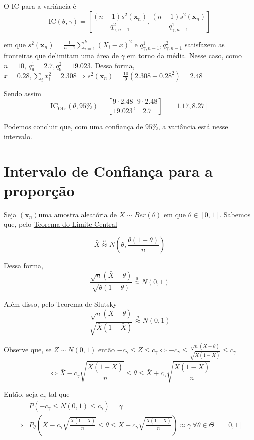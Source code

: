 \documentclass[
  letterpaper,
  DIV=11,
  numbers=noendperiod]{scrreprt}
\begin{document}
O IC para a variância é \[
\mathrm{IC}(\theta, \gamma) = \left[\frac{(n-1)s^2 (\pmb{x}_{n})}{q^2_{\gamma,n-1}},\frac{(n-1)s^2 (\pmb{x}_{n})}{q^1_{\gamma,n-1}}\right]
\]

em que
\(s^2 (\pmb{x}_{n}) = \frac{1}{n-1}\sum^{k}_{i=1}(X_i - \bar{x})^2\) e
\(q^{1}_{\gamma, n-1}, q^{2}_{\gamma, n-1}\) satisfazem as fronteiras
que delimitam uma área de \(\gamma\) em torno da média. Nesse caso, como
\(n = 10\), \(q^{1}_{9} = 2.7, q^{2}_{9} = 19.023\). Dessa forma,
\(\bar{x} = 0.28, \sum_{i}x_{i}^2=2.308 \Rightarrow s^2(\pmb{x}_{n}) = \frac{10}{9}(2.308 - 0.28^2) = 2.48\)

Sendo assim \[
\mathrm{IC}_{\mathrm{Obs}}(\theta, 95\%) = \left[\frac{9 \cdot 2.48}{19.023}, \frac{9 \cdot 2.48}{2.7}\right] = [1.17, 8.27]
\]

Podemos concluir que, com uma confiança de \(95\%\), a variância está
nesse intervalo.

\section{Intervalo de Confiança para a
proporção}\label{intervalo-de-confianuxe7a-para-a-proporuxe7uxe3o}

Seja \((\pmb{x}_{n})\)uma amostra aleatória de \(X\sim Ber(\theta)\) em
que \(\theta \in [0,1]\). Sabemos que, pelo \href{tlc.qmd}{Teorema do
Limite Central}

\[
\bar{X} \stackrel{a}{\approx} N\left( \theta, \frac{\theta (1-\theta)}{n} \right)
\]

Dessa forma, \[
\frac{\sqrt{ n }(\bar{X}-\theta)}{\sqrt{ \theta(1-\theta) }} \stackrel{a}{\approx} N(0,1)
\]

Além disso, pelo Teorema de Slutsky \[
\frac{\sqrt{ n }(\bar{X}-\theta)}{\sqrt{ \bar{X}(1-\bar{X}) }} \stackrel{a}{\approx} N(0,1)
\]

Observe que, se \(Z \sim N(0,1)\) então
\(-c_{\gamma}\leq Z \leq c_{\gamma} \Leftrightarrow -c_{\gamma }
\leq \frac{\sqrt{ n }(\bar{X}-\theta)}{\sqrt{ \bar{X}(1-\bar{X}) }}\leq c_{\gamma}\)
\[
\Leftrightarrow \bar{X} - c_{\gamma} \sqrt{ \frac{\bar{X} (1-\bar{X})}{n} } \leq \theta \leq \bar{X} + c_{\gamma}
\sqrt{\frac{\bar{X} (1-\bar{X})}{n}}
\]

Então, seja \(c_{\gamma}\) tal que \[
\begin{aligned}
&P (-c_{\gamma}\leq N(0,1)\leq c_{\gamma }) = \gamma \\
\Rightarrow &P_{\theta}\left(\bar{X} - c_{\gamma} \sqrt{ \frac{\bar{X} (1-\bar{X})}{n} } \leq \theta \leq
\bar{X} + c_{\gamma} \sqrt{ \frac{\bar{X} (1-\bar{X})}{n} }\right) \approx \gamma~ \forall \theta \in \Theta = [0,1]
\end{aligned}
\]
\end{document}
